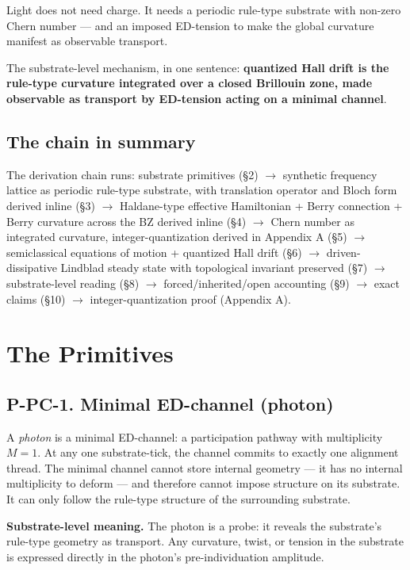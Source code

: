 \documentclass[11pt,a4paper]{article}
\begin{document}
Light does not need charge. It needs a periodic rule-type substrate with non-zero Chern number --- and an imposed ED-tension to make the global curvature manifest as observable transport.

The substrate-level mechanism, in one sentence: \textbf{quantized Hall drift is the rule-type curvature integrated over a closed Brillouin zone, made observable as transport by ED-tension acting on a minimal channel}.

\subsection*{The chain in summary}

The derivation chain runs: substrate primitives (\S2) $\to$ synthetic frequency lattice as periodic rule-type substrate, with translation operator and Bloch form derived inline (\S3) $\to$ Haldane-type effective Hamiltonian + Berry connection + Berry curvature across the BZ derived inline (\S4) $\to$ Chern number as integrated curvature, integer-quantization derived in Appendix A (\S5) $\to$ semiclassical equations of motion + quantized Hall drift (\S6) $\to$ driven-dissipative Lindblad steady state with topological invariant preserved (\S7) $\to$ substrate-level reading (\S8) $\to$ forced/inherited/open accounting (\S9) $\to$ exact claims (\S10) $\to$ integer-quantization proof (Appendix A).

\section{The Primitives}

\subsection{P-PC-1. Minimal ED-channel (photon)}

A \emph{photon} is a minimal ED-channel: a participation pathway with multiplicity $M = 1$. At any one substrate-tick, the channel commits to exactly one alignment thread. The minimal channel cannot store internal geometry --- it has no internal multiplicity to deform --- and therefore cannot impose structure on its substrate. It can only follow the rule-type structure of the surrounding substrate.

\textbf{Substrate-level meaning.} The photon is a probe: it reveals the substrate's rule-type geometry as transport. Any curvature, twist, or tension in the substrate is expressed directly in the photon's pre-individuation amplitude.
\end{document}
